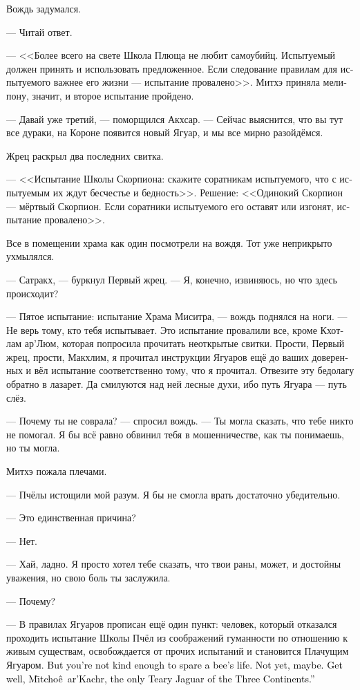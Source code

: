 \documentclass[a4paper,12pt,fleqn]{book}\usepackage{cooltooltips}\usepackage{polyglossia}\setdefaultlanguage{russian}\setotherlanguage{english}\defaultfontfeatures{Ligatures=TeX,Mapping=tex-text} \usepackage{xcolor}\definecolor{lightgray}{HTML}{bbbbbb}\color{lightgray}\newcommand{\ml}[3]{\textenglish{\textcolor{black}{#3}}}
\newcommand{\textspace}{\vspace{1em}{\centering\Large\bfseries<...>\par}\vspace{1em}}
\newcommand{\Mitchoe}{M\={\i}tcho\^{e}}
\begin{document}
Вождь задумался.

--- Читай ответ.

--- <<Более всего на свете Школа Плюща не любит самоубийц.
Испытуемый должен принять и использовать предложенное.
Если следование правилам для испытуемого важнее его жизни --- испытание провалено>>.
Митхэ приняла мелипону, значит, и второе испытание пройдено.

--- Давай уже третий, --- поморщился Акхсар.
--- Сейчас выяснится, что вы тут все дураки, на Короне появится новый Ягуар, и мы все мирно разойдёмся.

Жрец раскрыл два последних свитка.

--- <<Испытание Школы Скорпиона: скажите соратникам испытуемого, что с испытуемым их ждут бесчестье и бедность>>.
Решение:
<<Одинокий Скорпион --- мёртвый Скорпион.
Если соратники испытуемого его оставят или изгонят, испытание провалено>>.

Все в помещении храма как один посмотрели на вождя.
Тот уже неприкрыто ухмылялся.

--- Сатракх, --- буркнул Первый жрец.
--- Я, конечно, извиняюсь, но что здесь происходит?

--- Пятое испытание: испытание Храма Миситра, --- вождь поднялся на ноги.
--- Не верь тому, кто тебя испытывает.
Это испытание провалили все, кроме Кхотлам ар'Люм, которая попросила прочитать неоткрытые свитки.
Прости, Первый жрец, прости, Макхлим, я прочитал инструкции Ягуаров ещё до ваших доверенных и вёл испытание соответственно тому, что я прочитал.
Отвезите эту бедолагу обратно в лазарет.
Да смилуются над ней лесные духи, ибо путь Ягуара --- путь слёз.

\textspace

--- Почему ты не соврала? --- спросил вождь.
--- Ты могла сказать, что тебе никто не помогал.
Я бы всё равно обвинил тебя в мошенничестве, как ты понимаешь, но ты могла.

Митхэ пожала плечами.

--- Пчёлы истощили мой разум.
Я бы не смогла врать достаточно убедительно.

--- Это единственная причина?

--- Нет.

--- Хай, ладно.
Я просто хотел тебе сказать, что твои раны, может, и достойны уважения, но свою боль ты заслужила.

--- Почему?

--- В правилах Ягуаров прописан ещё один пункт: человек, который отказался проходить испытание Школы Пчёл из соображений гуманности по отношению к живым существам, освобождается от прочих испытаний и становится Плачущим Ягуаром.
\ml{$0$}
{Но для того, чтобы пощадить пчелу, тебе не хватило доброты.}
{But you're not kind enough to spare a bee's life.}
\ml{$0$}
{Возможно, только пока.}
{Not yet, maybe.}
\ml{$0$}
{Выздоравливай, Митхэ ар'Кахр, единственный Плачущий Ягуар Трёх Материков.}
{Get well, \Mitchoe\ ar'Kachr, the only Teary Jaguar of the Three Continents.''}
\end{document}
